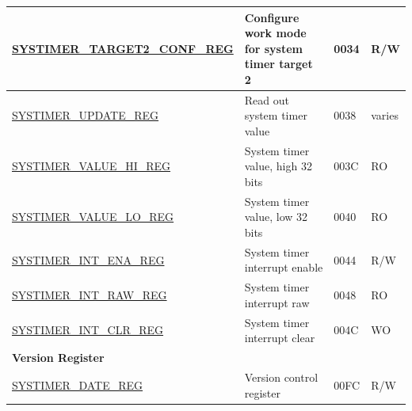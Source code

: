 \begin{longtable}{ | p{6cm} | p{7.2cm} | p{1.3cm} | p{1cm} | }
\hyperref[regdesc:SYSTIMERTARGET2CONFREG]{SYSTIMER\_TARGET2\_CONF\_REG} & Configure work mode for system timer target 2 & \hexprefix{}0034 & R/W \\ \hline
\hyperref[regdesc:SYSTIMERUPDATEREG]{SYSTIMER\_UPDATE\_REG} & Read out system timer value & \hexprefix{}0038 & varies \\ \hline
\hyperref[regdesc:SYSTIMERVALUEHIREG]{SYSTIMER\_VALUE\_HI\_REG} & System timer value, high 32 bits & \hexprefix{}003C & RO \\ \hline
\hyperref[regdesc:SYSTIMERVALUELOREG]{SYSTIMER\_VALUE\_LO\_REG} & System timer value, low 32 bits & \hexprefix{}0040 & RO \\ \hline
\hyperref[regdesc:SYSTIMERINTENAREG]{SYSTIMER\_INT\_ENA\_REG} & System timer interrupt enable & \hexprefix{}0044 & R/W \\ \hline
\hyperref[regdesc:SYSTIMERINTRAWREG]{SYSTIMER\_INT\_RAW\_REG} & System timer interrupt raw & \hexprefix{}0048 & RO \\ \hline
\hyperref[regdesc:SYSTIMERINTCLRREG]{SYSTIMER\_INT\_CLR\_REG} & System timer interrupt clear & \hexprefix{}004C & WO \\ \hline
\multicolumn{4}{|l|}{\textbf{Version Register}} \\ \hline
\hyperref[regdesc:SYSTIMERDATEREG]{SYSTIMER\_DATE\_REG} & Version control register& \hexprefix{}00FC & R/W \\ \hline
\end{longtable}
